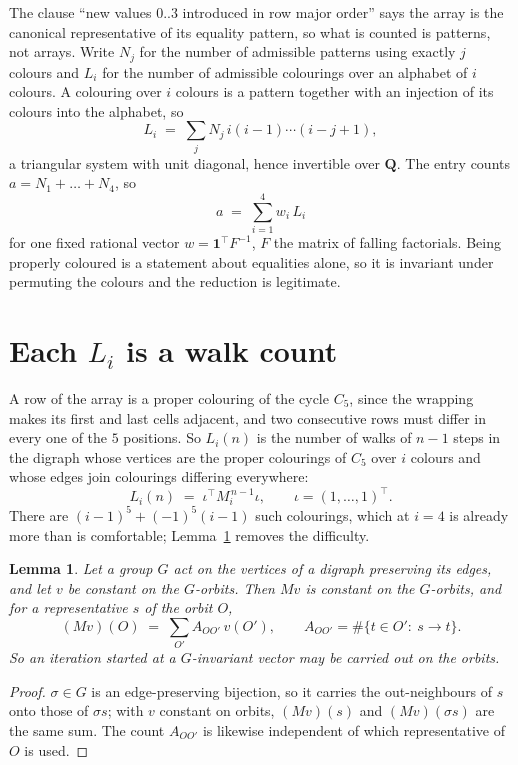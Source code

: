 \documentclass[11pt,a4paper]{article}
\theoremstyle{plain}
\newtheorem{lemma}[theorem]{Lemma}
\theoremstyle{definition}
\begin{document}
The clause ``new values $0..3$ introduced in row major order'' says the array is the
canonical representative of its equality pattern, so what is counted is patterns, not arrays.
Write $N_j$ for the number of admissible patterns using exactly $j$ colours and $L_i$ for the
number of admissible colourings over an alphabet of $i$ colours. A colouring over $i$ colours
is a pattern together with an injection of its colours into the alphabet, so
\[
L_i\;=\;\sum_j N_j\,i(i-1)\cdots(i-j+1),
\]
a triangular system with unit diagonal, hence invertible over $\mathbf{Q}$. The entry counts
$a=N_1+\dots+N_{4}$, so
\[
a\;=\;\sum_{i=1}^{4}w_i\,L_i
\]
for one fixed rational vector $w=\mathbf{1}^{\!\top}F^{-1}$, $F$ the matrix of falling
factorials. Being properly coloured is a statement about equalities alone, so it is invariant
under permuting the colours and the reduction is legitimate.

\section{Each $L_i$ is a walk count}

A row of the array is a proper colouring of the cycle $C_{5}$, since the wrapping makes
its first and last cells adjacent, and two consecutive rows must differ in every one of the
$5$ positions. So $L_i(n)$ is the number of walks of $n-1$ steps in the digraph whose
vertices are the proper colourings of $C_{5}$ over $i$ colours and whose edges join
colourings differing everywhere:
\[
L_i(n)\;=\;\iota^{\!\top}M_i^{\,n-1}\iota ,\qquad \iota=(1,\dots,1)^{\!\top} .
\]
There are $(i-1)^{5}+(-1)^{5}(i-1)$ such colourings, which at $i=4$ is already more
than is comfortable; Lemma~\ref{lem:lump} removes the difficulty.

\begin{lemma}\label{lem:lump}
Let a group $G$ act on the vertices of a digraph preserving its edges, and let $v$ be constant
on the $G$-orbits. Then $Mv$ is constant on the $G$-orbits, and for a representative $s$ of
the orbit $O$,
\[
(Mv)(O)\;=\;\sum_{O'}A_{OO'}\,v(O'),\qquad
A_{OO'}=\#\{t\in O':\ s\to t\} .
\]
So an iteration started at a $G$-invariant vector may be carried out on the orbits.
\end{lemma}

\begin{proof}
$\sigma\in G$ is an edge-preserving bijection, so it carries the out-neighbours of $s$ onto
those of $\sigma s$; with $v$ constant on orbits, $(Mv)(s)$ and $(Mv)(\sigma s)$ are the same
sum. The count $A_{OO'}$ is likewise independent of which representative of $O$ is used.
\end{proof}
\end{document}
